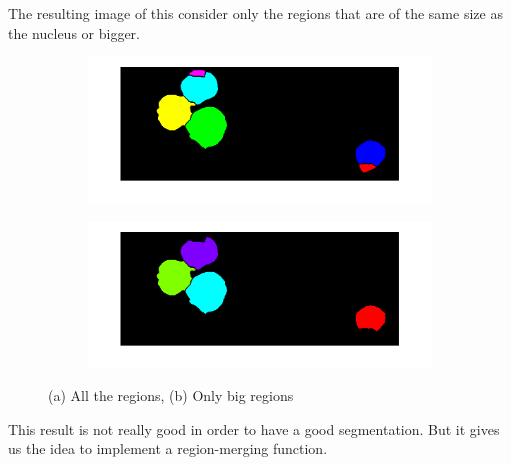 The resulting image of this consider only the regions that are of the same size as the nucleus or bigger.
\begin{figure}
	\centering
	\begin{subfigure}[b]{0.6\textwidth}
        \includegraphics[width=\textwidth]{img/celluleConCito.png}
        \caption{ }
        \label{fig:alltheregions}
    \end{subfigure}
    \begin{subfigure}[b]{0.6\textwidth}
		\includegraphics[width=\textwidth]{img/conteggioNuclei(noWatersheed).png}
		\caption{ }
		\label{fig:onlybigregions}
	\end{subfigure}
	\caption{(a) All the regions, (b) Only big regions}
	\label{fig:counting}
\end{figure}

\bigskip

This result is not really good in order to have a good segmentation. But it gives us the idea to implement a region-merging function. 
